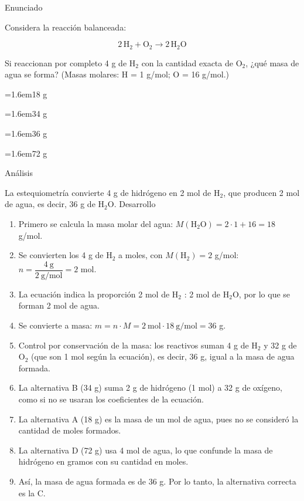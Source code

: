 \documentclass[10pt,a4paper,twocolumn]{article}
\newcommand{\alternativa}[2]{\par\noindent\hangindent=1.6em\hangafter=1\makebox[1.6em][l]{\tecla{#1}}#2\par}
\newcommand{\clave}[1]{\par\smallskip{\sffamily\footnotesize\color{esmeralda} Clave \teclaok{#1}}\par}
\begin{document}
\begin{ejemplo}
{\sffamily\footnotesize\color{zinc500} Enunciado}\par
Considera la reacción balanceada:

\[2\,\mathrm{H_2} + \mathrm{O_2} \rightarrow 2\,\mathrm{H_2O}\]

Si reaccionan por completo 4 g de $\mathrm{H_2}$ con la cantidad exacta de $\mathrm{O_2}$, ¿qué masa de agua se forma? (Masas molares: H = 1 g/mol; O = 16 g/mol.)
\alternativa{A}{18 g}
\alternativa{B}{34 g}
\alternativa{C}{36 g}
\alternativa{D}{72 g}
\clave{C}
{\sffamily\footnotesize\color{zinc500} Análisis}\par La estequiometría convierte 4 g de hidrógeno en 2 mol de $\mathrm{H_2}$, que producen 2 mol de agua, es decir, 36 g de $\mathrm{H_2O}$.
{\sffamily\footnotesize\color{zinc500} Desarrollo}
\begin{enumerate}
  \item Primero se calcula la masa molar del agua: $M(\mathrm{H_2O}) = 2\cdot 1 + 16 = 18$ g/mol.
  \item Se convierten los 4 g de $\mathrm{H_2}$ a moles, con $M(\mathrm{H_2}) = 2$ g/mol: $n = \dfrac{4\ \text{g}}{2\ \text{g/mol}} = 2$ mol.
  \item La ecuación indica la proporción 2 mol de $\mathrm{H_2}$ : 2 mol de $\mathrm{H_2O}$, por lo que se forman 2 mol de agua.
  \item Se convierte a masa: $m = n\cdot M = 2\ \text{mol}\cdot 18\ \text{g/mol} = 36$ g.
  \item Control por conservación de la masa: los reactivos suman 4 g de $\mathrm{H_2}$ y 32 g de $\mathrm{O_2}$ (que son 1 mol según la ecuación), es decir, 36 g, igual a la masa de agua formada.
  \item La alternativa B (34 g) suma 2 g de hidrógeno (1 mol) a 32 g de oxígeno, como si no se usaran los coeficientes de la ecuación.
  \item La alternativa A (18 g) es la masa de un mol de agua, pues no se consideró la cantidad de moles formados.
  \item La alternativa D (72 g) usa 4 mol de agua, lo que confunde la masa de hidrógeno en gramos con su cantidad en moles.
  \item Así, la masa de agua formada es de 36 g. Por lo tanto, la alternativa correcta es la C.
\end{enumerate}
\end{ejemplo}
\end{document}
